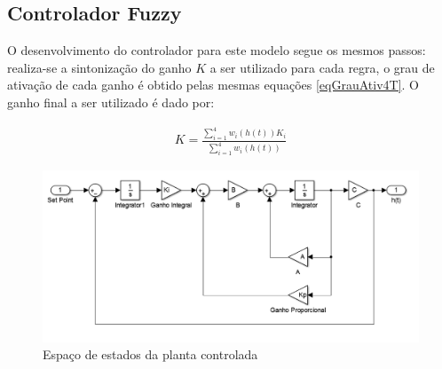 \subsection{Controlador Fuzzy}
	O desenvolvimento do controlador para este modelo segue os mesmos passos: realiza-se a sintonização do ganho $K$ a ser utilizado para cada regra, o grau de ativação de cada ganho é obtido pelas mesmas equações \ref{eqGrauAtiv4T}. O ganho final a ser utilizado é dado por:
	
	\begin{align}
		K = \frac{\sum_{i=1}^{4}  w_i(h(t))K_i}{\sum_{i=1}^{4} w_i(h(t))}
	\end{align}
	
	\begin{figure}
		\begin{centering}
			\includegraphics[width=\textwidth]{img/modelo_controlado.png}
			\par\end{centering}
		\caption{\label{figSimPlantCtrl}Espaço de estados da planta controlada}
	\end{figure}

%

